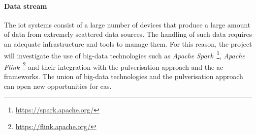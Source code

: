 \documentclass[12pt]{article}
\begin{document}

\paragraph{Data stream}
The \ac{iot} systems consist of a large number of devices that produce a large amount of data
from extremely scattered data sources.
%
The handling of such data requires an adequate infrastructure and tools to manage them.
%
For this reason, the project will investigate the use of big-data technologies
such as \emph{Apache Spark}~\footnote{\url{https://spark.apache.org/}},
\emph{Apache Flink}~\footnote{\url{https://flink.apache.org/}} and their integration with the pulverisation approach and the \ac{ac} frameworks.
%
The union of big-data technologies and the pulverisation approach can open new opportunities for \ac{cas}.
\end{document}
